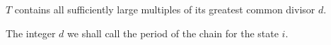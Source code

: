 $T$ contains all sufficiently large multiples of its greatest common divisor $d$.

The integer $d$ we shall call the period of the chain for the state $i$.
